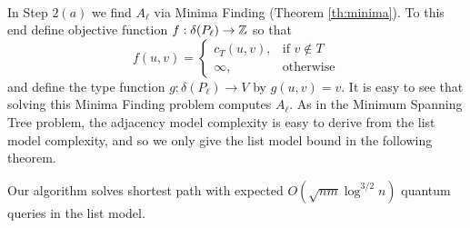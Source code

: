 \paragraph{}
In Step $2(a)$ we find $A_\ell$ via Minima Finding (Theorem \ref{th:minima}). To this end define objective function $f:\delta(P_\ell) \rightarrow \mathbb{Z}$ so that 
$$f(u,v) = \begin{cases}
c_T(u,v), &\text{if } v\not\in T \\
\infty, &\text{otherwise}
\end{cases}$$
and define the type function $g: \delta(P_\ell) \rightarrow V$ by $g(u,v) = v$. It is easy to see that solving this Minima Finding problem computes $A_\ell$. As in the Minimum Spanning Tree problem, the adjacency model complexity is easy to derive from the list model complexity, and so we only give the list model bound in the following theorem.
\begin{theorem}
Our algorithm solves shortest path with expected $O(\sqrt{nm}\log^{3/2}n)$ quantum queries in the list model.
\end{theorem}
